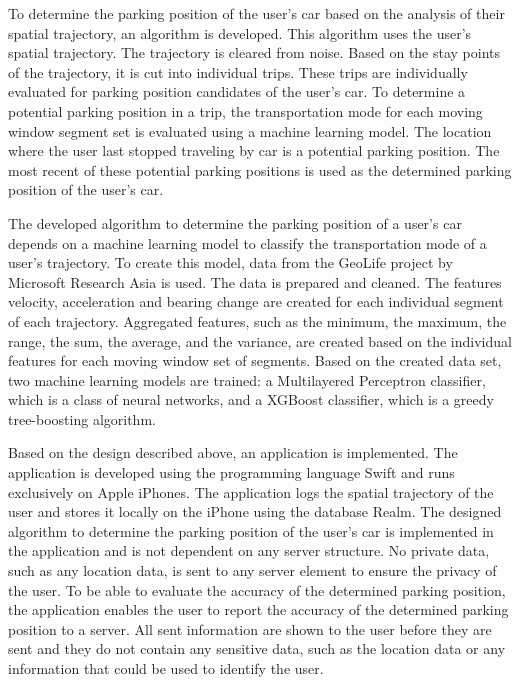 To determine the parking position of the user's car based on the analysis of their spatial trajectory, an algorithm is developed. This algorithm uses the user's spatial trajectory. The trajectory is cleared from noise. Based on the stay points of the trajectory, it is cut into individual trips. These trips are individually evaluated for parking position candidates of the user's car. To determine a potential parking position in a trip, the transportation mode for each moving window segment set is evaluated using a machine learning model. The location where the user last stopped traveling by car is a potential parking position. The most recent of these potential parking positions is used as the determined parking position of the user's car. 

The developed algorithm to determine the parking position of a user's car depends on a machine learning model to classify the transportation mode of a user's trajectory. To create this model, data from the GeoLife project by Microsoft Research Asia is used. The data is prepared and cleaned. The features velocity, acceleration and bearing change are created for each individual segment of each trajectory. Aggregated features, such as the minimum, the maximum, the range, the sum, the average, and the variance, are created based on the individual features for each moving window set of segments. Based on the created data set, two machine learning models are trained: a Multilayered Perceptron classifier, which is a class of neural networks, and a XGBoost classifier, which is a greedy tree-boosting algorithm. 

Based on the design described above, an application is implemented. The application is developed using the programming language Swift and runs exclusively on Apple iPhones. The application logs the spatial trajectory of the user and stores it locally on the iPhone using the database Realm. The designed algorithm to determine the parking position of the user's car is implemented in the application and is not dependent on any server structure. No private data, such as any location data, is sent to any server element to ensure the privacy of the user. To be able to evaluate the accuracy of the determined parking position, the application enables the user to report the accuracy of the determined parking position to a server. All sent information are shown to the user before they are sent and they do not contain any sensitive data, such as the location data or any information that could be used to identify the user. 

